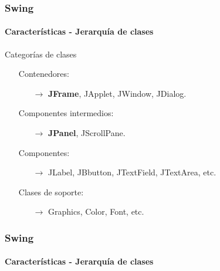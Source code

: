 \documentclass{beamer}
\begin{document}
	\begin{frame}
		\frametitle{Swing}
		\framesubtitle{Caracter\'isticas - Jerarqu\'ia de clases}
		
		Categor\'ias de clases
		\begin{itemize}
		    \item[\checkmark] Contenedores:
		    \begin{itemize}
        		    \item[$\rightarrow$] \textbf{JFrame}, JApplet, JWindow, JDialog.
        		\end{itemize}
		    \item[\checkmark] Componentes intermedios:
		    \begin{itemize}
        		    \item[$\rightarrow$] \textbf{JPanel}, JScrollPane.
        		\end{itemize}
		    \item[\checkmark] Componentes:
		    \begin{itemize}
        		    \item[$\rightarrow$] JLabel, JBbutton, JTextField, JTextArea, etc.
        		\end{itemize}
		    \item[\checkmark] Clases de soporte:
		    \begin{itemize}
        		    \item[$\rightarrow$] Graphics, Color, Font, etc.
        		\end{itemize}        		
		\end{itemize}
	\end{frame}

    \begin{frame}
		\frametitle{Swing}
		\framesubtitle{Caracter\'isticas - Jerarqu\'ia de clases}
		\begin{center}
		\end{center}
	\end{frame}
\end{document}
